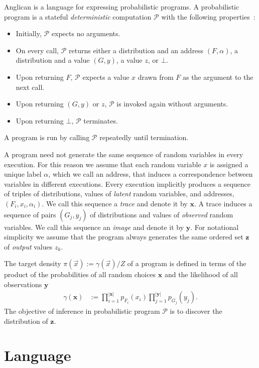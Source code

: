 \documentclass[preprint]{sigplanconf}
\begin{document}
Anglican is a language for expressing probabilistic programs.
A probabilistic program is a stateful \textit{deterministic} computation
$\mathcal{P}$ with the following properties~\cite{TMP+15}:
\begin{itemize}
\item Initially, $\mathcal{P}$ expects no arguments.
\item On every call, $\mathcal{P}$ returns either a distribution
  and an address $(F,\alpha)$, a distribution and a value $(G, y)$, a
  value $z$, or $\bot$.
\item Upon returning $F$, $\mathcal{P}$ expects a value $x$ drawn from $F$ as
  the argument to the next call.
\item Upon returning $(G, y)$ or $z$, $\mathcal{P}$ is invoked again
  without arguments.
\item Upon returning $\bot$, $\mathcal{P}$ terminates.
\end{itemize}
A program is run by calling $\mathcal{P}$ repeatedly until
termination.

A program need not generate the same sequence of random variables in
every execution. For this reason we assume that each random variable
$x$ is assigned a unique label $\alpha$, which we call an address,
that induces a correspondence between variables in different
executions. Every execution implicitly produces a sequence of triples
of distributions, values of \textit{latent} random variables, and
addresses, $(F_i, x_i, \alpha_i)$.  We call this sequence a
\textit{trace} and denote it by $\pmb{x}$. A trace induces a sequence
of pairs $(G_j, y_j)$ of distributions and values of
\textit{observed} random variables. We call this
sequence an \textit{image} and denote it by $\pmb{y}$. For notational simplicity we assume that the program always generates the same ordered set $\pmb{z}$ of \textit{output} values $z_k$.

The target density $\pi(\vec{x}) := \gamma(\vec{x}) / Z$ of a program
is defined in terms of the product of the probabilities of all random
choices $\pmb{x}$ and the likelihood of all observations $\pmb{y}$
\begin{align}
  \gamma(\pmb{x}) 
  &:= 
  \prod_{i=1}^{\left|\pmb{x}\right|}
  p_{F_i}(x_i) \prod_{j=1}^{\left|\pmb{y}\right|}p_{G_j}(y_{j}).
  \label{eqn:p-trace}
\end{align}
The objective of inference in probabilistic program $\mathcal{P}$
is to discover the distribution of $\pmb{z}$.

\section{Language}
\label{sec:language}
\end{document}
